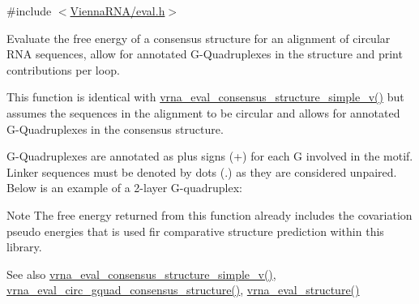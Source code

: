 {\ttfamily \#include $<$\mbox{\hyperlink{eval_8h}{Vienna\+R\+N\+A/eval.\+h}}$>$}



Evaluate the free energy of a consensus structure for an alignment of circular R\+NA sequences, allow for annotated G-\/\+Quadruplexes in the structure and print contributions per loop. 

This function is identical with \mbox{\hyperlink{group__eval_gad88927c62ab0a8b534e078e44be1b36e}{vrna\+\_\+eval\+\_\+consensus\+\_\+structure\+\_\+simple\+\_\+v()}} but assumes the sequences in the alignment to be circular and allows for annotated G-\/\+Quadruplexes in the consensus structure.

G-\/\+Quadruplexes are annotated as plus signs (\textquotesingle{}+\textquotesingle{}) for each G involved in the motif. Linker sequences must be denoted by dots (\textquotesingle{}.\textquotesingle{}) as they are considered unpaired. Below is an example of a 2-\/layer G-\/quadruplex\+: 
\begin{DoxyCode}{0}
\end{DoxyCode}


\begin{DoxyNote}{Note}
The free energy returned from this function already includes the covariation pseudo energies that is used fir comparative structure prediction within this library.
\end{DoxyNote}
\begin{DoxySeeAlso}{See also}
\mbox{\hyperlink{group__eval_gad88927c62ab0a8b534e078e44be1b36e}{vrna\+\_\+eval\+\_\+consensus\+\_\+structure\+\_\+simple\+\_\+v()}}, \mbox{\hyperlink{group__eval_gac673ebb9ae2a29f54d201e2ac5b85540}{vrna\+\_\+eval\+\_\+circ\+\_\+gquad\+\_\+consensus\+\_\+structure()}}, \mbox{\hyperlink{group__eval_ga58f199f1438d794a265f3b27fc8ea631}{vrna\+\_\+eval\+\_\+structure()}}
\end{DoxySeeAlso}

